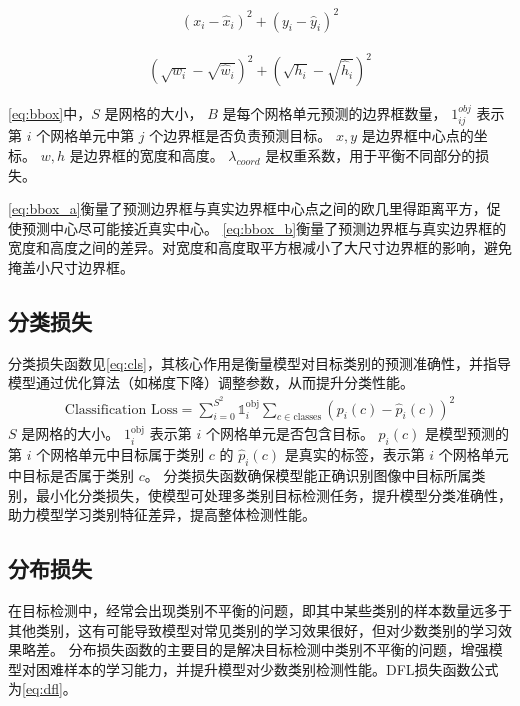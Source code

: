 \begin{equation}
  \begin{aligned}
    (x_i - \hat{x}_i)^2 + (y_i - \hat{y}_i)^2 \label{eq:bbox_a}
  \end{aligned}
\end{equation}

\begin{equation}
  \begin{aligned}
    (\sqrt{w_i} - \sqrt{\hat{w}_i})^2 + (\sqrt{h_i} - \sqrt{\hat{h}_i})^2 \label{eq:bbox_b}
  \end{aligned}
\end{equation}


\ref{eq:bbox}中，$S$ 是网格的大小，
$B$ 是每个网格单元预测的边界框数量，
$1_{ij}^{obj}$ 表示第 $i$ 个网格单元中第 $j$ 个边界框是否负责预测目标。
$x, y$ 是边界框中心点的坐标。
$w, h$ 是边界框的宽度和高度。
$\lambda_{coord}$ 是权重系数，用于平衡不同部分的损失。

\ref{eq:bbox_a}衡量了预测边界框与真实边界框中心点之间的欧几里得距离平方，促使预测中心尽可能接近真实中心。
\ref{eq:bbox_b}衡量了预测边界框与真实边界框的宽度和高度之间的差异。对宽度和高度取平方根减小了大尺寸边界框的影响，避免掩盖小尺寸边界框。

\subsection{分类损失}
分类损失函数见\ref{eq:cls}，其核心作用是衡量模型对目标类别的预测准确性，并指导模型通过优化算法（如梯度下降）调整参数，从而提升分类性能。
\begin{equation}
  \begin{aligned}
    \text{Classification Loss} = \sum_{i = 0}^{S^2} \mathbb{1}_{i}^{\text{obj}} \sum_{c \in \text{classes}} (p_i(c) - \hat{p}_i(c))^2 \label{eq:cls}
  \end{aligned}
\end{equation}
$S$ 是网格的大小。
$1_{i}^{\text{obj}}$ 表示第 $i$ 个网格单元是否包含目标。
$p_i(c)$ 是模型预测的第 $i$ 个网格单元中目标属于类别 $c$ 的
$\hat{p}_i(c)$ 是真实的标签，表示第 $i$ 个网格单元中目标是否属于类别 $c$。
分类损失函数确保模型能正确识别图像中目标所属类别，最小化分类损失，使模型可处理多类别目标检测任务，提升模型分类准确性，助力模型学习类别特征差异，提高整体检测性能。


\subsection{分布损失}
在目标检测中，经常会出现类别不平衡的问题，即其中某些类别的样本数量远多于其他类别，这有可能导致模型对常见类别的学习效果很好，但对少数类别的学习效果略差。
分布损失函数的主要目的是解决目标检测中类别不平衡的问题，增强模型对困难样本的学习能力，并提升模型对少数类别检测性能。DFL损失函数公式为\ref{eq:dfl}。

